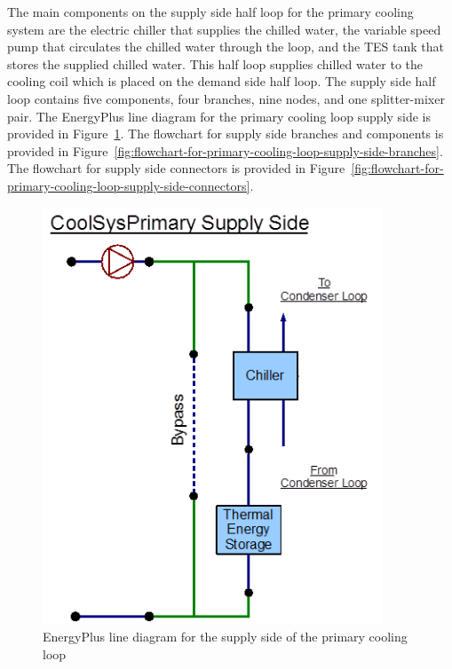 The main components on the supply side half loop for the primary cooling system are the electric chiller that supplies the chilled water, the variable speed pump that circulates the chilled water through the loop, and the TES tank that stores the supplied chilled water. This half loop supplies chilled water to the cooling coil which is placed on the demand side half loop. The supply side half loop contains five components, four branches, nine nodes, and one splitter-mixer pair. The EnergyPlus line diagram for the primary cooling loop supply side is provided in Figure~\ref{fig:energyplus-line-diagram-for-the-supply-side-006}. The flowchart for supply side branches and components is provided in Figure~\ref{fig:flowchart-for-primary-cooling-loop-supply-side-branches}. The flowchart for supply side connectors is provided in Figure~\ref{fig:flowchart-for-primary-cooling-loop-supply-side-connectors}.

\begin{figure}[hbtp] %
\centering
\includegraphics[width=0.9\textwidth, height=0.9\textheight, keepaspectratio=true]{media/image049.png}
\caption{EnergyPlus line diagram for the supply side of the primary cooling loop \protect \label{fig:energyplus-line-diagram-for-the-supply-side-006}}
\end{figure}

